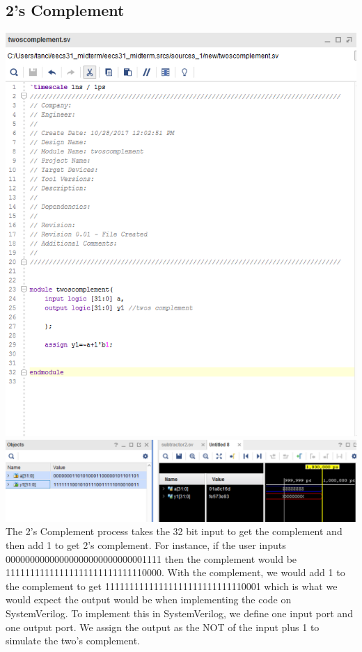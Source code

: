 \documentclass{article}
\begin{document}
\subsection{2's Complement}
\includegraphics[scale=.50]{photos/twoscomplement_code}
\break
\includegraphics[scale=.5]{photos/twocomplement_simulation}
\break
The 2's Complement process takes the 32 bit input to get the complement and then add 1 to get 2's complement. For instance, if the user inputs \\ 00000000000000000000000000001111 then the complement would be \\ 11111111111111111111111111110000. With the complement, we would add 1 to the complement to get 11111111111111111111111111110001 which is what we would expect the output would be when implementing the code on SystemVerilog. To implement this in SystemVerilog, we define one input port and one output port. We assign the output as the NOT of the input plus 1 to simulate the two's complement.
\end{document}
